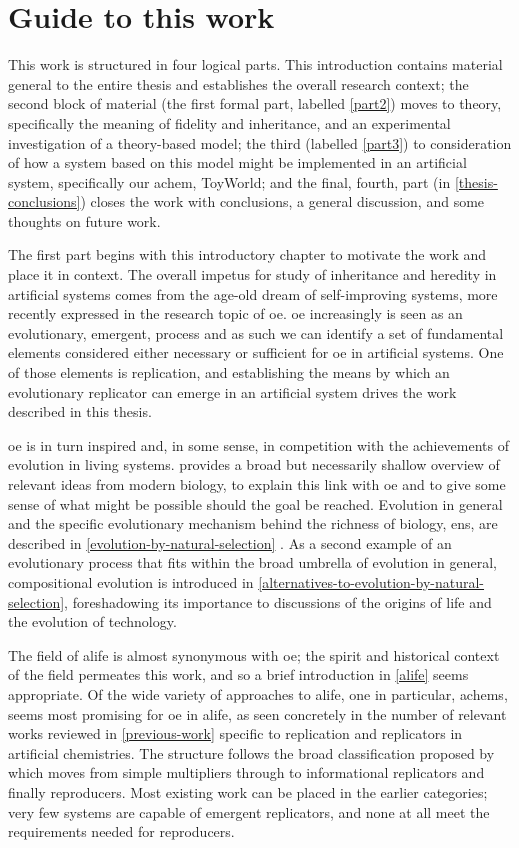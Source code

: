 \section{Guide to this work}

This work is structured in four logical parts. This introduction contains material general to the entire thesis and establishes the overall research context; the second block of material (the first formal part, labelled \cref{part2}) moves to theory, specifically the meaning of fidelity and inheritance, and an experimental investigation of a theory-based model; the third (labelled \cref{part3}) to consideration of how a system based on this model might be implemented in an artificial system, specifically our \gls{achem}, ToyWorld; and the final, fourth, part (in \cref{thesis-conclusions}) closes the work with conclusions, a general discussion, and some thoughts on future work.

The first part begins with this introductory chapter to motivate the work and place it in context. The overall impetus for study of inheritance and heredity in artificial systems comes from the age-old dream of self-improving systems, more recently expressed in the research topic of \gls{oe}. \Gls{oe} increasingly is seen as an evolutionary, emergent, process and as such we can identify a set of fundamental elements considered either necessary or sufficient for \gls{oe} in artificial systems. One of those elements is replication, and establishing the means by which an evolutionary replicator can emerge in an artificial system drives the work described in this thesis.

\Gls{oe} is in turn inspired and, in some sense, in competition with the achievements of evolution in living systems.  provides a broad but necessarily shallow overview of relevant ideas from modern biology, to explain this link with \gls{oe} and to give some sense of what might be possible should the goal be reached. Evolution in general and the specific evolutionary mechanism behind the richness of biology, \gls{ens}, are described in \cref{evolution-by-natural-selection} . As a second example of an evolutionary process that fits within the broad umbrella of evolution in general, compositional evolution is introduced in \cref{alternatives-to-evolution-by-natural-selection}, foreshadowing its importance to discussions of the origins of life and the evolution of technology.

The field of \gls{alife} is almost synonymous with \gls{oe}; the spirit and historical context of the field permeates this work, and so a brief introduction in \cref{alife} seems appropriate.  Of the wide variety of approaches to \gls{alife}, one in particular, \glspl{achem}, seems most promising for \gls{oe} in \gls{alife}, as seen concretely in the number of relevant works reviewed in \cref{previous-work} specific to replication and replicators in artificial chemistries. The structure follows the broad classification proposed by \textcite{Zachar2010} which moves from simple multipliers through to informational replicators and finally reproducers. Most existing work can be placed in the earlier categories; very few systems are capable of emergent replicators, and none at all meet the requirements needed for reproducers.

